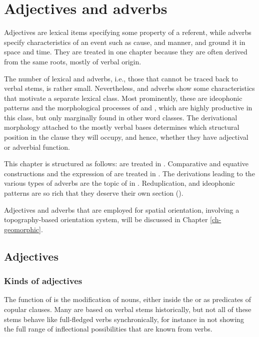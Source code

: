 ﻿
\chapter{Adjectives and adverbs} \label{adj-adv}

Adjectives are lexical items specifying some property of a referent, while adverbs specify characteristics of an event such as cause,  and manner, and ground it in space and time. They are treated in one chapter because they are often derived from the same roots, mostly of verbal origin.  

The number of lexical  and adverbs, i.e., those that cannot be traced back to verbal stems, is rather small. Nevertheless,  and adverbs show some characteristics that motivate a separate lexical class. Most prominently, these are ideophonic patterns and the morphological processes of  and , which are highly  pro\-duc\-tive in this class, but only marginally found in other word classes. The derivational morphology attached to the mostly verbal bases deter\-mines which structural position in the clause they will occupy, and hence, whether they have adjectival or adverbial function. 

This chapter is structured as follows:   are treated in . Comparative and equative constructions and the expression of  are treated in .  The  derivations leading to the various types of adverbs are the topic of in . Reduplication,  and ideophonic patterns are so rich that they deserve their own section (). 

Adjectives and adverbs that are employed for  spatial orientation, involving a topography-based  orientation system, will be discussed in Chapter \ref{ch-geomorphic}. 

\section{Adjectives}\label{adj}

\subsection{Kinds of adjectives}\label{adj-kinds}

The function of  is the modification of nouns, either inside the  or as predicates of copular clauses. Many  are based on verbal stems historically, but not all of these stems behave like full-fledged verbs synchronically, for  instance in not showing the full range of inflectional possibilities that are known from verbs. 

